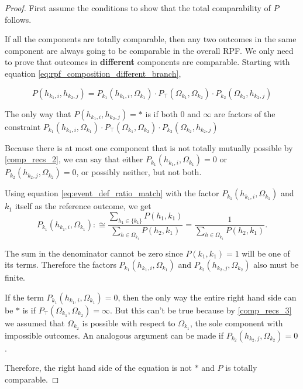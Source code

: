 \documentclass[twoside]{article}
\theoremstyle{plain}%
\theoremstyle{definition}
\theoremstyle{remark}
\begin{document}
\begin{proof}
First assume the conditions to show that the total comparability of \(P\) follows.

If all the components are totally comparable, then any two outcomes in the same component are always going to be comparable in the overall RPF. We only need to prove that outcomes in \textbf{different} components are comparable. Starting with equation \ref{eq:rpf_composition_different_branch},

\begin{equation}
P(h_{k_1, i}, h_{k_2, j}) = P_{k_1}(h_{k_1, i}, \Omega_{k_1}) \cdot  P_{\top}(\Omega_{k_1}, \Omega_{k_2}) \cdot P_{k_2}(\Omega_{k_2}, h_{k_2, j})
\end{equation}

The only way that \(P(h_{k_1, i}, h_{k_2, j}) = \ast\) is if both \(0\) and \(\infty\) are factors of the constraint \(P_{k_1}(h_{k_1, i}, \Omega_{k_1}) \cdot  P_{\top}(\Omega_{k_1}, \Omega_{k_2}) \cdot P_{k_2}(\Omega_{k_2}, h_{k_2, j})\)

Because there is at most one component that is not totally mutually possible by \ref{comp_recs_2}, we can say that either \(P_{k_1}(h_{k_1, i}, \Omega_{k_1}) = 0\) or \(P_{k_2}(h_{k_2, j}, \Omega_{k_2}) = 0\), or possibly neither, but not both.

Using equation \ref{eq:event_def_ratio_match} with the factor \(P_{k_1}(h_{k_1, i}, \Omega_{k_1})\) and \(k_1\) itself as the reference outcome, we get
\[
P_{k_1}(h_{k_1, i}, \Omega_{k_1}) :\cong \frac{\sum_{h_1 \in \{k_1\}} P(h_1, k_1)}{\sum_{h \in \Omega_{k_1}} P(h_2, k_1)} = \frac{1}{\sum_{h \in \Omega_{k_1}} P(h_2, k_1)}.
\]

The sum in the denominator cannot be zero since \(P(k_1, k_1) = 1\) will be one of its terms. Therefore the factors \(P_{k_1}(h_{k_1, i}, \Omega_{k_1})\) and \(P_{k_2}(h_{k_2, j}, \Omega_{k_2})\) also must be finite.

If the term \(P_{k_1}(h_{k_1, i}, \Omega_{k_1}) = 0\), then the only way the entire right hand side can be \(\ast\) is if \(P_{\top}(\Omega_{k_1}, \Omega_{k_2}) = \infty\). But this can't be true because by \ref{comp_recs_3} we assumed that \(\Omega_{k_2}\) is possible with respect to \(\Omega_{k_1}\), the sole component with impossible outcomes. An analogous argument can be made if \(P_{k_2}(h_{k_2, j}, \Omega_{k_2}) = 0\).

Therefore, the right hand side of the equation is not \(\ast\) and \(P\) is totally comparable.


\end{proof}
\end{document}

